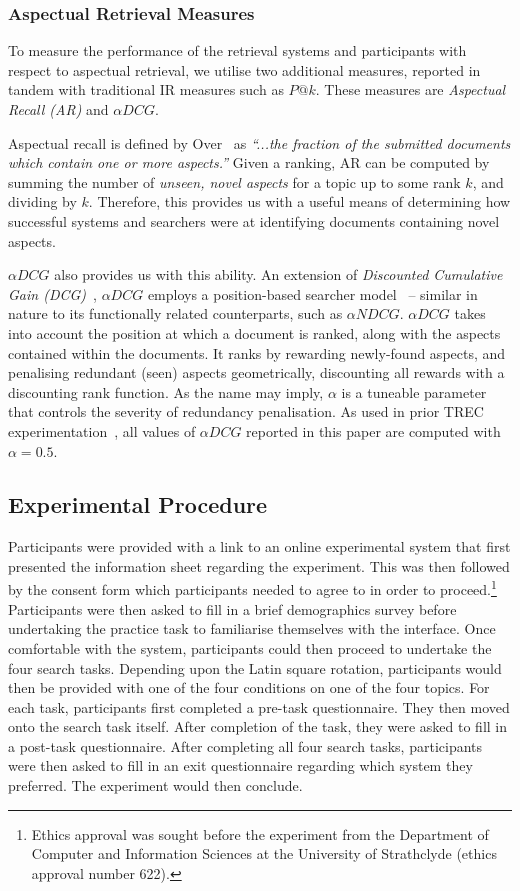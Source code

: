 \subsubsection{Aspectual Retrieval Measures}\label{sec_measures}
To measure the performance of the retrieval systems and participants with respect to aspectual retrieval, we utilise two additional measures, reported in tandem with traditional IR measures such as $P@k$. These measures are \emph{Aspectual Recall (AR)} and $\alpha DCG$.

Aspectual recall is defined by Over~\cite{over1998trec} as \emph{``...the fraction of the submitted documents which contain one or more aspects.''} Given a ranking, AR can be computed by summing the number of \emph{unseen, novel aspects} for a topic up to some rank $k$, and dividing by $k$. Therefore, this provides us with a useful means of determining how successful systems and searchers were at identifying documents containing novel aspects.

$\alpha DCG$ also provides us with this ability. An extension of \emph{Discounted Cumulative Gain (DCG)}~\cite{jarvelin2002ndcg}, $\alpha DCG$ employs a position-based searcher model~\cite{clarke2008novelty_diversity} -- similar in nature to its functionally related counterparts, such as $\alpha NDCG$. $\alpha DCG$ takes into account the position at which a document is ranked, along with the aspects contained within the documents. It ranks by rewarding newly-found aspects, and penalising redundant (seen) aspects geometrically, discounting all rewards with a discounting rank function. As the name may imply, $\alpha$ is a tuneable parameter that controls the severity of redundancy penalisation. As used in prior TREC experimentation~\cite{over2001trec}, all values of $\alpha DCG$ reported in this paper are computed with $\alpha=0.5$.

\subsection{Experimental Procedure}
Participants were provided with a link to an online experimental system that first presented the information sheet regarding the experiment. This was then followed by the consent form which participants needed to agree to in order to proceed.\footnote{Ethics approval was sought before the experiment from the Department of Computer and Information Sciences at the University of Strathclyde (ethics approval number 622).} Participants were then asked to fill in a brief demographics survey before undertaking the practice task to familiarise themselves with the interface. Once comfortable with the system, participants could then proceed to undertake the four search tasks. Depending upon the Latin square rotation, participants would then be provided with one of the four conditions on one of the four topics. For each task, participants first completed a pre-task questionnaire. They then moved onto the search task itself. After completion of the task, they were asked to fill in a post-task questionnaire. After completing all four search tasks, participants were then asked to fill in an exit questionnaire regarding which system they preferred. The experiment would then conclude.

